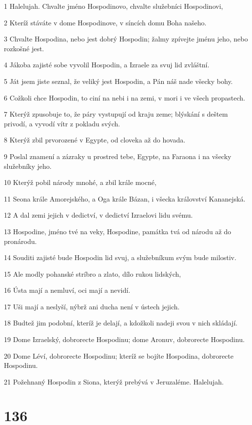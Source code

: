 \par 1 Halelujah. Chvalte jméno Hospodinovo, chvalte služebníci Hospodinovi,
\par 2 Kteríž stáváte v dome Hospodinove, v síncích domu Boha našeho.
\par 3 Chvalte Hospodina, nebo jest dobrý Hospodin; žalmy zpívejte jménu jeho, nebo rozkošné jest.
\par 4 Jákoba zajisté sobe vyvolil Hospodin, a Izraele za svuj lid zvláštní.
\par 5 Ját jsem jiste seznal, že veliký jest Hospodin, a Pán náš nade všecky bohy.
\par 6 Cožkoli chce Hospodin, to ciní na nebi i na zemi, v mori i ve všech propastech.
\par 7 Kterýž zpusobuje to, že páry vystupují od kraju zeme; blýskání s deštem privodí, a vyvodí vítr z pokladu svých.
\par 8 Kterýž zbil prvorozené v Egypte, od cloveka až do hovada.
\par 9 Poslal znamení a zázraky u prostred tebe, Egypte, na Faraona i na všecky služebníky jeho.
\par 10 Kterýž pobil národy mnohé, a zbil krále mocné,
\par 11 Seona krále Amorejského, a Oga krále Bázan, i všecka království Kananejská.
\par 12 A dal zemi jejich v dedictví, v dedictví Izraelovi lidu svému.
\par 13 Hospodine, jméno tvé na veky, Hospodine, památka tvá od národu až do pronárodu.
\par 14 Souditi zajisté bude Hospodin lid svuj, a služebníkum svým bude milostiv.
\par 15 Ale modly pohanské stríbro a zlato, dílo rukou lidských,
\par 16 Ústa mají a nemluví, oci mají a nevidí.
\par 17 Uši mají a neslyší, nýbrž ani ducha není v ústech jejich.
\par 18 Budtež jim podobní, kteríž je delají, a kdožkoli nadeji svou v nich skládají.
\par 19 Dome Izraelský, dobrorecte Hospodinu; dome Aronuv, dobrorecte Hospodinu.
\par 20 Dome Léví, dobrorecte Hospodinu; kteríž se bojíte Hospodina, dobrorecte Hospodinu.
\par 21 Požehnaný Hospodin z Siona, kterýž prebývá v Jeruzaléme. Halelujah.

\chapter{136}


